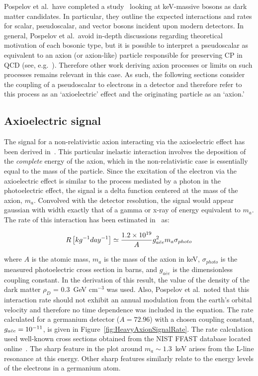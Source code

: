 	Pospelov et al.~have completed a study~\cite{Pospelov:2008jk} looking at keV-massive bosons as dark matter candidates.  In particular, they outline the expected interactions and rates for scalar, pseudoscalar, and vector bosons incident upon modern detectors.  In general, Pospelov et al.~avoid in-depth discussions regarding theoretical motivation of each bosonic type, but it is possible to interpret a pseudoscalar as equivalent to an axion (or axion-like) particle responsible for preserving CP in QCD (see, e.g.~\cite{Amsler20081}).  Therefore other work deriving axion processes or limits on such processes remains relevant in this case.  As such, the following sections consider the coupling of a pseudoscalar to electrons in a detector and therefore refer to this process as an `axioelectric' effect and the originating particle as an `axion.'  

	\subsection{Axioelectric signal}
	\label{sec:CalcLimitsOnHeavyAxionSignal}		

	The signal for a non-relativistic axion interacting via the axioelectric effect has been derived in~\cite{Pospelov:2008jk}.  This particular inelastic interaction involves the deposition of the \emph{complete} energy of the axion, which in the non-relativistic case is essentially equal to the mass of the particle.  Since the excitation of the electron via the axioelectric effect is similar to the process mediated by a photon in the photoelectric effect, the signal is a delta function centered at the mass of the axion, $m_{a}$.  Convolved with the detector resolution, the signal would appear gaussian with width exactly that of a gamma or x-ray of energy equivalent to $m_{a}$.  The rate of this interaction has been estimated in~\cite{Pospelov:2008jk} as:
	
		\begin{equation}
			R \left[ kg^{-1} day^{-1} \right]\simeq \frac{1.2\times 10^{19}}{A} g_{a\bar{e}e}^{2} m_a \sigma_{photo}
			\label{eqn:AxioelectricRate}
		\end{equation}

where $A$ is the atomic mass, $m_{a}$ is the mass of the axion in keV, $\sigma_{photo}$ is the measured photoelectric cross section in barns, and $g_{a\bar{e}e}$ is the dimensionless coupling constant.  In the derivation of this result, the value of the density of the dark matter $\rho_{D}$ = 0.3~GeV cm$^{-3}$ was used.  Also, Pospelov et al.~noted that this interaction rate should not exhibit an annual modulation from the earth's orbital velocity and therefore no time dependence was included in the equation.  The rate calculated for a germanium detector ($A=72.96$) with a chosen coupling constant, $g_{a\bar{e}e} = 10^{-11}$, is given in Figure~\ref{fig:HeavyAxionSignalRate}.  The rate calculation used well-known cross sections obtained from the NIST FFAST database located online~\cite{chantler:597}.  The sharp feature in the plot around $m_{a}\sim1.3$~keV arises from the L-line resonance at this energy.  Other sharp features similarly relate to the energy levels of the electrons in a germanium atom.  

